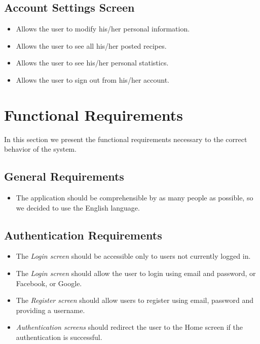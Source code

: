 	\subsection{Account Settings Screen}
		\begin{itemize}
			\item Allows the user to modify his/her personal information.
			
			\item Allows the user to see all his/her posted recipes.
			
			\item Allows the user to see his/her personal statistics.
			
			\item Allows the user to sign out from his/her account.
		\end{itemize}


\section{Functional Requirements}
	In this section we present the functional requirements necessary to the correct behavior of the system.

	\subsection{General Requirements}
		\begin{itemize}
			\item The application should be comprehensible by as many people as possible, so we decided to use the English language.
		\end{itemize}

	\subsection{Authentication Requirements}
		\begin{itemize}
			\item The \textit{Login screen} should be accessible only to users not currently logged in.
			\item The \textit{Login screen} should allow the user to login using email and password, or Facebook, or Google.
			\item The \textit{Register screen} should allow users to register using email, password and providing a username. 
			\item \textit{Authentication screens} should redirect the user to the Home screen if the authentication is successful.
		\end{itemize}

